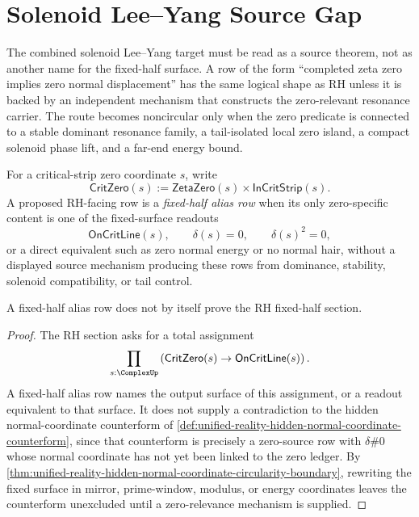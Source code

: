 \section{Solenoid Lee--Yang Source Gap}
\label{sec:unified-reality-solenoid-lee-yang-source-gap}

The combined solenoid Lee--Yang target must be read as a source theorem,
not as another name for the fixed-half surface.  A row of the form
``completed zeta zero implies zero normal displacement'' has the same
logical shape as RH unless it is backed by an independent mechanism that
constructs the zero-relevant resonance carrier.  The route becomes
noncircular only when the zero predicate is connected to a stable
dominant resonance family, a tail-isolated local zero island, a compact
solenoid phase lift, and a far-end energy bound.

\begin{definition}
\label{def:unified-reality-fixed-half-alias-row}
For a critical-strip zero coordinate $s$, write
$$
\mathsf{CritZero}(s)
:=
\mathsf{ZetaZero}(s)\times\mathsf{InCritStrip}(s).
$$
A proposed RH-facing row is a \emph{fixed-half alias row} when its only
zero-specific content is one of the fixed-surface readouts
$$
\mathsf{OnCritLine}(s),
\qquad
\delta(s)=0,
\qquad
\delta(s)^2=0,
$$
or a direct equivalent such as zero normal energy or no normal hair,
without a displayed source mechanism producing these rows from
dominance, stability, solenoid compatibility, or tail control.
\end{definition}

\begin{theorem}
\label{thm:unified-reality-fixed-half-aliases-do-not-discharge-proof-load}
A fixed-half alias row does not by itself prove the RH fixed-half
section.
\end{theorem}

\begin{proof}
The RH section asks for a total assignment
$$
\prod_{s:\ComplexUp}
\left(
\mathsf{CritZero}(s)\to\mathsf{OnCritLine}(s)
\right).
$$
A fixed-half alias row names the output surface of this assignment, or a
readout equivalent to that surface.  It does not supply a contradiction
to the hidden normal-coordinate counterform of
\autoref{def:unified-reality-hidden-normal-coordinate-counterform}, since
that counterform is precisely a zero-source row with $\delta\#0$ whose
normal coordinate has not yet been linked to the zero ledger.  By
\autoref{thm:unified-reality-hidden-normal-coordinate-circularity-boundary},
rewriting the fixed surface in mirror, prime-window, modulus, or energy
coordinates leaves the counterform unexcluded until a zero-relevance
mechanism is supplied.
\end{proof}

